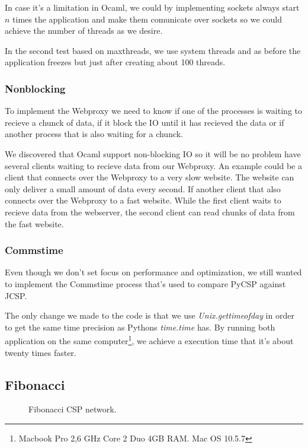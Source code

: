 \documentclass[a4paper,12pt]{article}
\begin{document}
In case it's a limitation in Ocaml, we could by implementing sockets always
start $n$ times the application and make them comunicate over sockets so we
could achieve the number of threads as we desire.

In the second test based on maxthreads, we use system threads and as before
the application freezes but just after creating about 100 threads.


\subsubsection*{Nonblocking}
To implement the Webproxy we need to know if one of the processes is waiting
to recieve a chunck of data, if it block the IO until it has recieved the data
or if another process that is also waiting for a chunck.

We discovered that Ocaml support non-blocking IO so it will be no problem have
several clients waiting to recieve data from our Webproxy. An example could
be a client that connects over the Webproxy to a very slow website. The website
can only deliver a small amount of data every second. If another client that
also connects over the Webproxy to a fast website. While the first client
waits to recieve data from the webserver, the second client can read chunks
of data from the fast website.


\subsubsection*{Commstime}
Even though we don't set focus on performance and optimization, we still wanted
to implement the Commstime\cite{vinterpycsp} process that's used to compare
PyCSP against JCSP.

The only change we made to the code is that we use {\it Unix.gettimeofday} in
order to get the same time precision as Pythons {\it time.time} has. By running
both application on the same computer\footnote{Macbook Pro 2,6 GHz Core 2 Duo
4GB RAM. Mac OS 10.5.7}, we achieve a execution time that it's about twenty
times faster.

\subsection{Fibonacci}
\begin{figure}[h]
  \begin{center}
  \end{center}
  \caption{Fibonacci CSP network.}
\end{figure}
\end{document}
